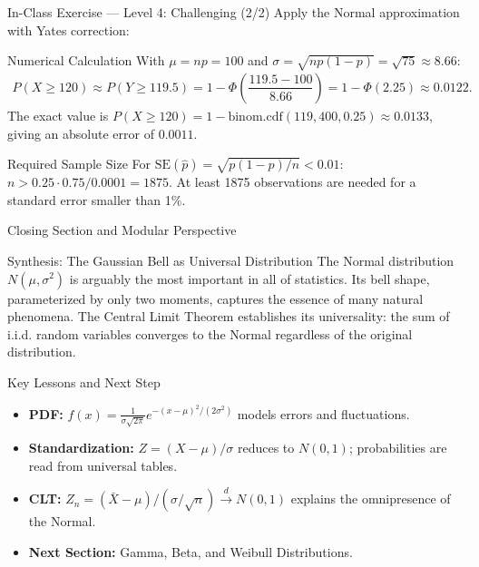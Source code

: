 \documentclass[aspectratio=169,xcolor={dvipsnames,table}]{beamer}
\begin{document}
\begin{frame}{In-Class Exercise --- Level 4: Challenging (2/2)}
	\vspace{-0.05cm}
	\scriptsize
	Apply the Normal approximation with Yates correction: \pause
	\begin{block}{Numerical Calculation}
		\scriptsize
		With $\mu = np = 100$ and $\sigma = \sqrt{np(1-p)} = \sqrt{75} \approx 8.66$:
		\begin{align*}
			P(X \ge 120) \approx P(Y \ge 119.5) = 1 - \Phi\left(\dfrac{119.5 - 100}{8.66}\right) = 1 - \Phi(2.25) \approx 0.0122.
		\end{align*}
		The exact value is $P(X \ge 120) = 1 - \text{binom.cdf}(119, 400, 0.25) \approx 0.0133$, giving an absolute error of $0.0011$.
	\end{block}
	\vspace{0.05cm}
	\pause
	\begin{alertblock}{Required Sample Size}
		\scriptsize
		For $\text{SE}(\hat{p}) = \sqrt{p(1-p)/n} < 0.01$: $n > 0.25 \cdot 0.75/0.0001 = 1875$. At least 1875 observations are needed for a standard error smaller than 1\%.
	\end{alertblock}
\end{frame}

\begin{frame}{Closing Section and Modular Perspective}
	\vspace{-0.2cm}
	\begin{block}{Synthesis: The Gaussian Bell as Universal Distribution}
		\scriptsize
		The Normal distribution $N(\mu, \sigma^{2})$ is arguably the most important in all of statistics. Its bell shape, parameterized by only two moments, captures the essence of many natural phenomena. The Central Limit Theorem establishes its universality: the sum of i.i.d. random variables converges to the Normal regardless of the original distribution.
	\end{block}
	\vspace{0.05cm}
	\pause
	\begin{alertblock}{Key Lessons and Next Step}
		\begin{itemize}\itemsep=0.05cm
			\item \textbf{PDF:} $f(x) = \frac{1}{\sigma\sqrt{2\pi}} e^{-(x-\mu)^{2}/(2\sigma^{2})}$ models errors and fluctuations.
			\item \textbf{Standardization:} $Z = (X-\mu)/\sigma$ reduces to $N(0,1)$; probabilities are read from universal tables.
			\item \textbf{CLT:} $Z_{n} = (\bar{X}-\mu)/(\sigma/\sqrt{n}) \xrightarrow{d} N(0,1)$ explains the omnipresence of the Normal.
			\item \textbf{Next Section:} \textcolor{TecRojo}{Gamma, Beta, and Weibull Distributions}.
		\end{itemize}
	\end{alertblock}
\end{frame}
\end{document}
